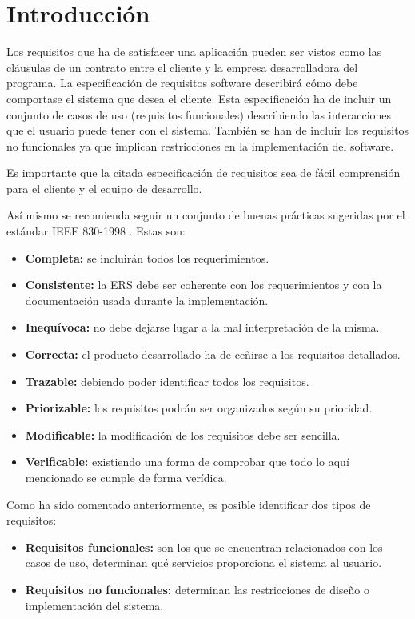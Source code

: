
\section{Introducción}

Los requisitos \cite{req:info} que ha de satisfacer una aplicación pueden ser vistos como las cláusulas de un contrato entre el cliente y la empresa desarrolladora del programa. La especificación de requisitos software describirá cómo debe comportase el sistema que desea el cliente. Esta especificación ha de incluir un conjunto de casos de uso (requisitos funcionales) describiendo las interacciones que el usuario puede tener con el sistema. También se han de incluir los requisitos no funcionales ya que implican restricciones en la implementación del software.

Es importante que la citada especificación de requisitos sea de fácil comprensión para el cliente y el equipo de desarrollo.

Así mismo se recomienda seguir un conjunto de buenas prácticas sugeridas por el estándar IEEE 830-1998 \cite{ieee:info}. Estas son:

\begin{itemize}
	\item \textbf{Completa:} se incluirán todos los requerimientos.
	\item \textbf{Consistente:} la ERS debe ser coherente con los requerimientos y con la documentación usada durante la implementación.
	\item \textbf{Inequívoca:} no debe dejarse lugar a la mal interpretación de la misma.
	\item \textbf{Correcta:} el producto desarrollado ha de ceñirse a los requisitos detallados.
	\item \textbf{Trazable:} debiendo poder identificar todos los requisitos.
	\item \textbf{Priorizable:} los requisitos podrán ser organizados según su prioridad.
	\item \textbf{Modificable:} la modificación de los requisitos debe ser sencilla. 
	\item \textbf{Verificable:} existiendo una forma de comprobar que todo lo aquí mencionado se cumple de forma verídica.
\end{itemize}

Como ha sido comentado anteriormente, es posible identificar dos tipos de requisitos:

\begin{itemize}
	\item \textbf{Requisitos funcionales:} son los que se encuentran relacionados con los casos de uso, determinan qué servicios proporciona el sistema al usuario.
	\item \textbf{Requisitos no funcionales:} determinan las restricciones de diseño o implementación del sistema.
\end{itemize}


